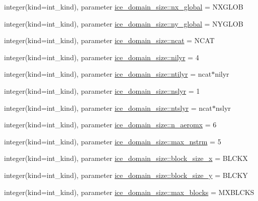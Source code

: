 \begin{DoxyCompactItemize}
\item 
integer(kind=int\_\-kind), parameter \hyperlink{namespaceice__domain__size_aefcbe884e789decfd40a43558e59ce6f}{ice\_\-domain\_\-size::nx\_\-global} = NXGLOB
\item 
integer(kind=int\_\-kind), parameter \hyperlink{namespaceice__domain__size_ae668c8c91f91c2a63ce14581f198e1af}{ice\_\-domain\_\-size::ny\_\-global} = NYGLOB
\item 
integer(kind=int\_\-kind), parameter \hyperlink{namespaceice__domain__size_af6426e75baee1427e99bac2564d5afd7}{ice\_\-domain\_\-size::ncat} = NCAT
\item 
integer(kind=int\_\-kind), parameter \hyperlink{namespaceice__domain__size_a5c1a0b8bcf4dc16b485be17beea4f6bf}{ice\_\-domain\_\-size::nilyr} = 4
\item 
integer(kind=int\_\-kind), parameter \hyperlink{namespaceice__domain__size_a46a923e86a6a0f553260f445f9faf5c9}{ice\_\-domain\_\-size::ntilyr} = ncat$\ast$nilyr
\item 
integer(kind=int\_\-kind), parameter \hyperlink{namespaceice__domain__size_aa5abf2eae8654b241bf06dac90d70c6b}{ice\_\-domain\_\-size::nslyr} = 1
\item 
integer(kind=int\_\-kind), parameter \hyperlink{namespaceice__domain__size_a2b95950726524c87034f6468ba946b2a}{ice\_\-domain\_\-size::ntslyr} = ncat$\ast$nslyr
\item 
integer(kind=int\_\-kind), parameter \hyperlink{namespaceice__domain__size_a61a60feb03a21a007ce6e62858188393}{ice\_\-domain\_\-size::n\_\-aeromx} = 6
\item 
integer(kind=int\_\-kind), parameter \hyperlink{namespaceice__domain__size_a5b7e71626d60541574b8431d717d2c42}{ice\_\-domain\_\-size::max\_\-nstrm} = 5
\item 
integer(kind=int\_\-kind), parameter \hyperlink{namespaceice__domain__size_a6e6f2cb739480c307cb4a416f6cde96f}{ice\_\-domain\_\-size::block\_\-size\_\-x} = BLCKX
\item 
integer(kind=int\_\-kind), parameter \hyperlink{namespaceice__domain__size_a7b805f9f706b3843b3b4da02974a2654}{ice\_\-domain\_\-size::block\_\-size\_\-y} = BLCKY
\item 
integer(kind=int\_\-kind), parameter \hyperlink{namespaceice__domain__size_abb7c0f274dd4e8ef1b66bc8785478941}{ice\_\-domain\_\-size::max\_\-blocks} = MXBLCKS
\end{DoxyCompactItemize}
